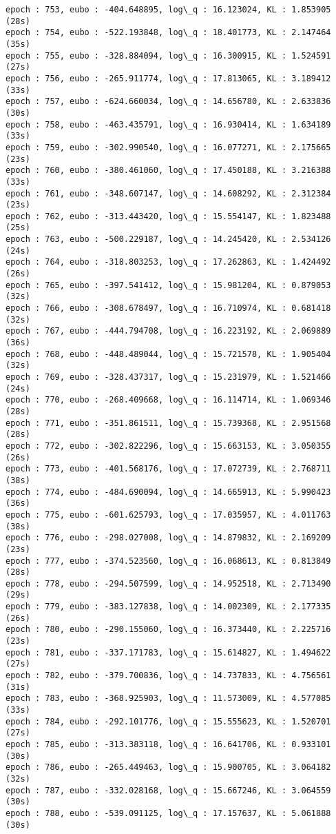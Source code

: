 \documentclass[11pt]{article}
\begin{document}
\begin{Verbatim}[commandchars=\\\{\}]
epoch : 753, eubo : -404.648895, log\_q : 16.123024, KL : 1.853905 (28s)
epoch : 754, eubo : -522.193848, log\_q : 18.401773, KL : 2.147464 (35s)
epoch : 755, eubo : -328.884094, log\_q : 16.300915, KL : 1.524591 (27s)
epoch : 756, eubo : -265.911774, log\_q : 17.813065, KL : 3.189412 (33s)
epoch : 757, eubo : -624.660034, log\_q : 14.656780, KL : 2.633836 (30s)
epoch : 758, eubo : -463.435791, log\_q : 16.930414, KL : 1.634189 (33s)
epoch : 759, eubo : -302.990540, log\_q : 16.077271, KL : 2.175665 (23s)
epoch : 760, eubo : -380.461060, log\_q : 17.450188, KL : 3.216388 (33s)
epoch : 761, eubo : -348.607147, log\_q : 14.608292, KL : 2.312384 (23s)
epoch : 762, eubo : -313.443420, log\_q : 15.554147, KL : 1.823488 (25s)
epoch : 763, eubo : -500.229187, log\_q : 14.245420, KL : 2.534126 (24s)
epoch : 764, eubo : -318.803253, log\_q : 17.262863, KL : 1.424492 (26s)
epoch : 765, eubo : -397.541412, log\_q : 15.981204, KL : 0.879053 (32s)
epoch : 766, eubo : -308.678497, log\_q : 16.710974, KL : 0.681418 (32s)
epoch : 767, eubo : -444.794708, log\_q : 16.223192, KL : 2.069889 (36s)
epoch : 768, eubo : -448.489044, log\_q : 15.721578, KL : 1.905404 (32s)
epoch : 769, eubo : -328.437317, log\_q : 15.231979, KL : 1.521466 (24s)
epoch : 770, eubo : -268.409668, log\_q : 16.114714, KL : 1.069346 (28s)
epoch : 771, eubo : -351.861511, log\_q : 15.739368, KL : 2.951568 (28s)
epoch : 772, eubo : -302.822296, log\_q : 15.663153, KL : 3.050355 (26s)
epoch : 773, eubo : -401.568176, log\_q : 17.072739, KL : 2.768711 (38s)
epoch : 774, eubo : -484.690094, log\_q : 14.665913, KL : 5.990423 (36s)
epoch : 775, eubo : -601.625793, log\_q : 17.035957, KL : 4.011763 (38s)
epoch : 776, eubo : -298.027008, log\_q : 14.879832, KL : 2.169209 (23s)
epoch : 777, eubo : -374.523560, log\_q : 16.068613, KL : 0.813849 (28s)
epoch : 778, eubo : -294.507599, log\_q : 14.952518, KL : 2.713490 (29s)
epoch : 779, eubo : -383.127838, log\_q : 14.002309, KL : 2.177335 (26s)
epoch : 780, eubo : -290.155060, log\_q : 16.373440, KL : 2.225716 (23s)
epoch : 781, eubo : -337.171783, log\_q : 15.614827, KL : 1.494622 (27s)
epoch : 782, eubo : -379.700836, log\_q : 14.737833, KL : 4.756561 (31s)
epoch : 783, eubo : -368.925903, log\_q : 11.573009, KL : 4.577085 (33s)
epoch : 784, eubo : -292.101776, log\_q : 15.555623, KL : 1.520701 (27s)
epoch : 785, eubo : -313.383118, log\_q : 16.641706, KL : 0.933101 (30s)
epoch : 786, eubo : -265.449463, log\_q : 15.900705, KL : 3.064182 (32s)
epoch : 787, eubo : -332.028168, log\_q : 15.667246, KL : 3.064559 (30s)
epoch : 788, eubo : -539.091125, log\_q : 17.157637, KL : 5.061888 (30s)

\end{Verbatim}
\end{document}
